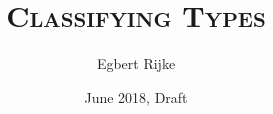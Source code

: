 \documentclass[twosided]{memoir}
\title{\textsc{\Huge Classifying Types}}
\author{Egbert Rijke}
\date{June 2018, Draft}
\begin{document}
\frontmatter

\begin{titlingpage}
\maketitle
\end{titlingpage}

\begin{comment}
\clearpage
\thispagestyle{empty}
\par
\vspace*{.35\textheight}{\begin{flushright}With infinite gratitude I dedicate this thesis to my parents.\par\end{flushright}}

\clearpage
\end{comment}

\tableofcontents



\mainmatter

























%



\backmatter

\printbibliography
\end{document}
